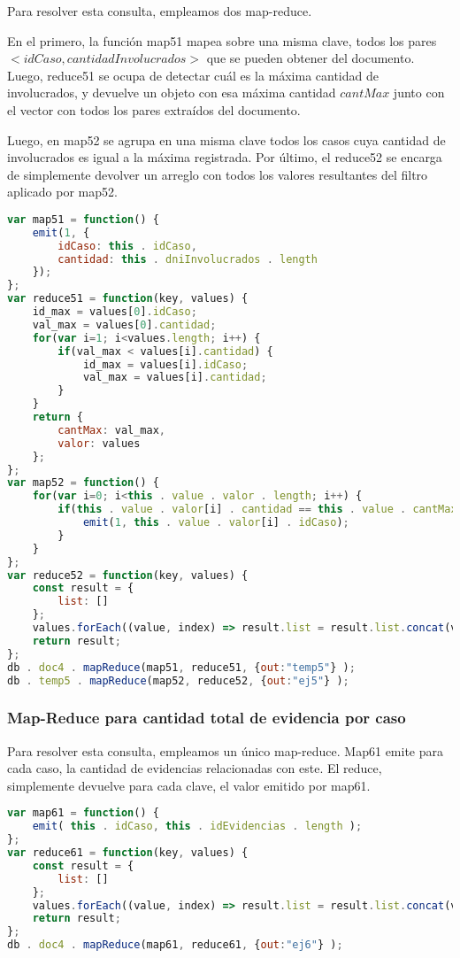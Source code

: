 \documentclass[11pt, a4paper]{article}
\begin{document}
Para resolver esta consulta, empleamos dos map-reduce.

En el primero, la función map51 mapea sobre una misma clave, todos los pares $<idCaso, cantidadInvolucrados>$ que se pueden obtener del documento. Luego, reduce51 se ocupa de detectar cuál es la máxima cantidad de involucrados, y devuelve un objeto con esa máxima cantidad $cantMax$ junto con el vector con todos los pares extraídos del documento. 

Luego, en map52 se agrupa en una misma clave todos los casos cuya cantidad de involucrados es igual a la máxima registrada. Por último, el reduce52 se encarga de simplemente devolver un arreglo con todos los valores resultantes del filtro aplicado por map52.

\begin{lstlisting}[language=JavaScript]
var map51 = function() {
    emit(1, {
        idCaso: this . idCaso,
        cantidad: this . dniInvolucrados . length
    });
};
var reduce51 = function(key, values) {
    id_max = values[0].idCaso;
    val_max = values[0].cantidad;
    for(var i=1; i<values.length; i++) {
        if(val_max < values[i].cantidad) {
            id_max = values[i].idCaso;
            val_max = values[i].cantidad;
        }
    }
    return {
        cantMax: val_max,
        valor: values
    };
};
var map52 = function() {
    for(var i=0; i<this . value . valor . length; i++) {
        if(this . value . valor[i] . cantidad == this . value . cantMax) {
            emit(1, this . value . valor[i] . idCaso);
        }
    }
};
var reduce52 = function(key, values) {
    const result = {
        list: []
    };
    values.forEach((value, index) => result.list = result.list.concat(value));
    return result;
};
db . doc4 . mapReduce(map51, reduce51, {out:"temp5"} );
db . temp5 . mapReduce(map52, reduce52, {out:"ej5"} );
\end{lstlisting}

\subsubsection{Map-Reduce para cantidad total de evidencia por caso}

Para resolver esta consulta, empleamos un único map-reduce. Map61 emite para cada caso, la cantidad de evidencias relacionadas con este. El reduce, simplemente devuelve para cada clave, el valor emitido por map61.

\begin{lstlisting}[language=JavaScript]
var map61 = function() {
    emit( this . idCaso, this . idEvidencias . length );
};
var reduce61 = function(key, values) {
    const result = {
        list: []
    };
    values.forEach((value, index) => result.list = result.list.concat(value));
    return result;
};
db . doc4 . mapReduce(map61, reduce61, {out:"ej6"} );
\end{lstlisting}
\end{document}
